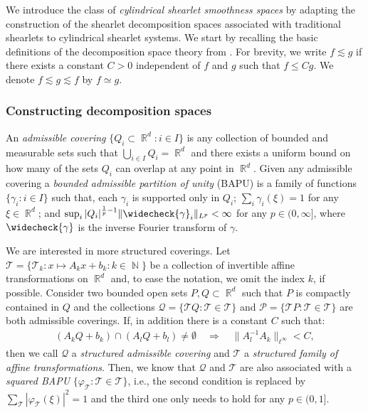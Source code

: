 \documentclass[11pt,a4paper]{article}
\numberwithin{equation}{section}
\DeclareMathOperator{\R}{\mathbb{R}}
\DeclareMathOperator{\N}{\mathbb{N}}
\newcommand{\bapu}{\varphi} %
\newcommand{\mcP}{\mathcal{P}}  %
\newcommand{\mcQ}{\mathcal{Q}}  %
\newcommand{\mcT}{\mathcal{T}}  %
\newcommand{\msT}{\mathscr{T}} %
\begin{document}
We introduce the class of \emph{cylindrical shearlet smoothness spaces} by adapting the construction of the shearlet decomposition spaces \cite{labate13} associated with traditional shearlets \cite{shearlets, guo10} to cylindrical shearlet systems. 
We start by recalling the basic definitions of the decomposition space theory from \cite{feichtinger1985banach, feichtinger1987banach, borup2007frame}. For brevity, we write $f \lesssim g$ if there exists a constant $C > 0$ independent of $f$ and $g$ such that $f \leq C g$. We denote $f \lesssim g \lesssim f$ by $f \simeq g$.


\subsubsection{Constructing decomposition spaces} \label{sssec:DecompSpaceIntro}

An \emph{admissible covering} $\lbrace Q_i \subset \R^d : i \in I \rbrace$ is any collection of bounded and measurable sets such that $\bigcup_{i \in I} Q_i = \R^d$ and there exists a uniform bound on how many of the sets $Q_i$ can overlap at any point in $\R^d$. 
Given any admissible covering a \emph{bounded admissible partition of unity} (BAPU) is a family of functions $\lbrace \gamma_i : i \in I \rbrace$ such that, each $\gamma_i$ is supported only in $Q_i$; $\sum_i \gamma_i(\xi) = 1$ for any $\xi \in \R^d$; and $\sup_i |Q_i|^{\frac{1}{p}-1} \| \widecheck{\gamma}_i \|_{L^p} < \infty$ for any $p \in (0, \infty]$, where $\widecheck{\gamma}$ is the inverse Fourier transform of $\gamma$.

We are interested in more structured coverings. Let $\mcT = \lbrace \msT_k: x \mapsto A_k x + b_k : k \in \N \rbrace$ be a collection of invertible affine transformations on $\R^d$ and, to ease the notation, we omit the index $k$, if possible. Consider two bounded open sets $P, Q \subset \R^d$ such that $P$ is compactly contained in $Q$ and the collections $\mcQ = \lbrace \msT Q : \msT \in \mcT \rbrace$ and 
$\mcP = \lbrace \msT P : \msT \in \mcT \rbrace$ 
are both admissible coverings. If, in addition there is a constant $C$ such that:
\begin{align*}
    (A_k Q + b_k) \cap (A_l Q + b_l) \neq \emptyset \quad \Longrightarrow \quad \|A_l^{-1} A_k \|_{\ell^\infty} < C,
\end{align*} 
then we call $\mcQ$ a \emph{structured admissible covering} and $\mcT$ a \emph{structured family of affine transformations}. Then, we know that $\mcQ$ and $\mcT$ are also associated with a \emph{squared BAPU} $\lbrace \bapu_\msT : \msT \in \mcT \rbrace$, i.e., the second condition is replaced by $\sum_\msT |\bapu_\msT (\xi) |^2 = 1$ and the third one only needs to hold for any $p \in (0,1]$. 
\end{document}

